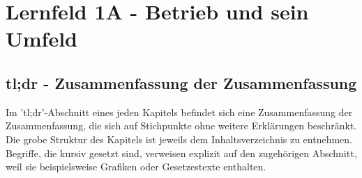 \section{Lernfeld 1A - Betrieb und sein Umfeld}

\subsection{tl;dr - Zusammenfassung der Zusammenfassung}
Im 'tl;dr'-Abschnitt eines jeden Kapitels befindet sich eine Zusammenfassung der Zusammenfassung, die sich auf Stichpunkte ohne weitere Erklärungen beschränkt. Die grobe Struktur des Kapitels ist jeweils dem Inhaltsverzeichnis zu entnehmen. Begriffe, die kursiv gesetzt sind, verweisen explizit auf den zugehörigen Abschnitt, weil sie beispielsweise Grafiken oder Gesetzestexte enthalten.
